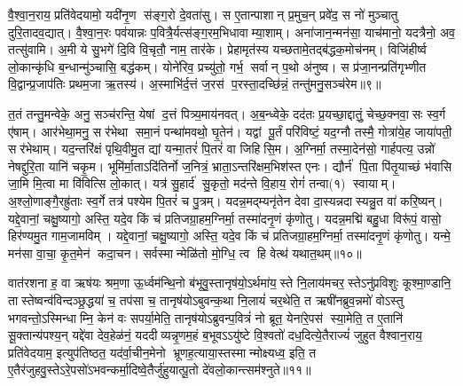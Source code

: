 वै॒श्वा॒न॒राय॒ प्रति॑वेदयामो॒ यदी॑नृ॒ण स॑ङ्ग॒रो दे॒वता॑सु। स ए॒तान्पाशान् प्र॒मुच॒न् प्रवे॑द॒ स नो॑ मुञ्चातु दुरि॒तादव॒द्यात्। वै॒श्वा॒न॒रः पव॑यान्नः प॒वित्रै॒र्यत्स॑ङ्ग॒रम॒भिधावाम्या॒शाम्। अना॑जान॒न्मन॑सा॒ याच॑मानो॒ यदत्रैनो॒ अव॒ तत्सु॑वामि। अ॒मी ये सु॒भगे॑ दि॒वि वि॒चृतौ॒ नाम॒ तार॑के। प्रेहामृत॑स्य यच्छतामे॒तद्ब॑द्धक॒मोच॑नम्। विजि॑हीर्ष्व लो॒कान्कृ॑धि ब॒न्धान्मु॑ञ्चासि॒ बद्ध॑कम्। योने॑रिव॒ प्रच्यु॑तो॒ गर्भ॒ सर्वान् प॒थो अ॑नुष्व। स प्र॑जा॒नन्प्रति॑गृभ्णीत वि॒द्वान्प्र॒जाप॑तिः प्रथम॒जा ऋ॒तस्य॑। अ॒स्माभि॑र्द॒त्तं ज॒रस॑ प॒रस्ता॒दच्छि॑न्नं॒ तन्तु॑मनु॒सञ्च॑रेम॥९॥

त॒तं तन्तु॒मन्वेके॒ अनु॒ सञ्च॑रन्ति॒ येषां द॒त्तं पित्र्य॒माय॑नवत्। अ॒ब॒न्ध्वेके॒ दद॑तः प्र॒यच्छा॒द्दातुं॒ चेच्छ॒क्नवा॒सः स्व॒र्ग ए॑षाम्। आर॑भेथा॒मनु॒ सर॑भेथा समा॒नं पन्था॑मवथो॒ घृ॒तेन॑। यद्वां पू॒र्तं परि॑विष्टं॒ यद॒ग्नौ तस्मै॒ गोत्रा॑ये॒ह जाया॑पती॒ सर॑भेथाम्। यद॒न्तरि॑क्षं पृथि॒वीमु॒त द्यां यन्मा॒तरं॑ पि॒तरं॑ वा जिहिसि॒म। अ॒ग्निर्मा॒ तस्मा॒देन॑सो॒ गार्\mbox{}हपत्य॒ उन्नो॑ नेषद्दुरि॒ता यानि॑ चकृ॒म। भूमि॑र्मा॒ताऽदि॑तिर्नो ज॒नित्रं॒ भ्राता॒ऽन्तरि॑क्षम॒भिश॑स्त एनः। द्यौर्न॑ पि॒ता पि॑तृ॒याच्छं भ॑वासि जा॒मि मि॒त्वा मा वि॑वित्सि लो॒कात्। यत्र॑ सु॒हार्द॑ सु॒कृतो॒ मद॑न्ते वि॒हाय॒ रोगं॑ तन्वा(१) स्वायाम्। अ॒श्लो॒णाङ्गै॒रह्रु॑ताः स्व॒र्गे तत्र॑ पश्येम पि॒तरं॑ च पु॒त्रम्। यदन्न॒मद्म्यनृ॑तेन देवा दा॒स्यन्नदास्यन्नु॒त वा॑ करि॒ष्यन्। यद्दे॒वानां॒ चक्षु॒ष्यागो॒ अस्ति॒ यदे॒व किं च॑ प्रतिजग्रा॒हम॒ग्निर्मा॒ तस्मा॑दनृ॒णं कृ॑णोतु। यदन्न॒मद्मि॑ बहु॒धा विरू॑पं॒ वासो॒ हिर॑ण्यमु॒त गाम॒जामविम्। यद्दे॒वानां॒ चक्षु॒ष्यागो॒ अस्ति॒ यदे॒व किं च॑ प्रतिजग्रा॒हम॒ग्निर्मा॒ तस्मा॑दनृ॒णं कृ॑णोतु। यन्मे॒ मन॑सा वा॒चा॒ कृ॒त॒मेन॑ कदा॒चन। सर्वस्मान्मेळि॑तो मो॒ग्धि॒ त्व हि वेत्थ॑ यथात॒थम्॥१०॥\anuvakamend

वात॑रशना ह॒ वा ऋष॑यः श्रम॒णा ऊ॒र्ध्वम॑न्थि॒नो ब॑भूवु॒स्तानृष॑यो॒\-ऽर्थमा॑य॒स्ते नि॒लाय॑मचर॒स्तेऽनु॑प्रविशुः कूश्मा॒ण्डानि॒ तास्तेष्वन्व॑विन्दञ्छ्र॒द्धया॑ च॒ तप॑सा च॒ तानृष॑योऽबुवन्क॒था नि॒लायं॑ चर॒थेति॒ त ऋषी॑नब्रुव॒न्नमो॑ वोऽस्तु भगवन्तो॒ऽस्मिन्धाम्नि॒ केन॑ वः सपर्या॒मेति॒ तानृष॑योऽब्रुवन्प॒वित्रं॑ नो ब्रूत॒ येना॑रे॒पस॑ स्या॒मेति॒ त ए॒तानि॑ सू॒क्तान्य॑पश्य॒न् यद्दे॑वा देव॒हेळ॑नं॒ यददीव्यन्नृ॒णम॒हं ब॒भूवऽऽयु॑ष्टे वि॒श्वतो॑ दध॒दित्ये॒तैराज्यं॑ जुहुत वैश्वान॒राय॒ प्रति॑वेदयाम॒ इत्युप॑तिष्ठत॒ यद॑र्वा॒चीन॒मेनो भ्रूणह॒त्याया॒स्तस्मान्मोक्ष्यध्व॒ इति॒ त ए॒तैर॑जुहवु॒स्तेऽरे॒पसो॑\-ऽभवन्कर्मा॒दिष्वे॒तैर्जु॑हुयात्पू॒तो दे॑वलो॒कान्त्सम॑श्नुते॥११॥\anuvakamend


